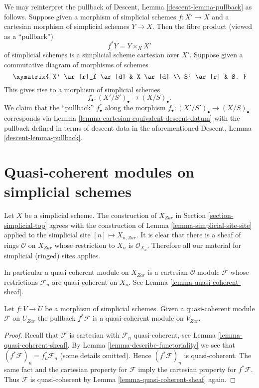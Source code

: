 \noindent
We may reinterpret the pullback of
Descent, Lemma \ref{descent-lemma-pullback} as follows.
Suppose given a morphism of simplicial schemes $f : X' \to X$ and a
cartesian morphism of simplicial schemes $Y \to X$. Then
the fibre product (viewed as a ``pullback'')
$$
f^*Y = Y \times_X X'
$$
of simplicial schemes is a simplicial scheme cartesian over $X'$.
Suppose given a commutative diagram of morphisms of schemes
$$
\xymatrix{
X' \ar[r]_f \ar[d] & X \ar[d] \\
S' \ar[r] & S.
}
$$
This gives rise to a morphism of simplicial schemes
$$
f_\bullet : (X'/S')_\bullet \longrightarrow (X/S)_\bullet.
$$
We claim that the ``pullback'' $f_\bullet^*$ along the morphism
$f_\bullet : (X'/S')_\bullet \to (X/S)_\bullet$ corresponds via
Lemma \ref{lemma-cartesian-equivalent-descent-datum}
with the pullback defined in terms of descent data in
the aforementioned
Descent, Lemma \ref{descent-lemma-pullback}.







\section{Quasi-coherent modules on simplicial schemes}
\label{section-modules-simplicial}

\noindent
Let $X$ be a simplicial scheme. The construction of $X_{Zar}$
in Section \ref{section-simplicial-top} agrees with the
construction of Lemma \ref{lemma-simplicial-site-site}
applied to the simplicial site $[n] \mapsto X_{n, Zar}$.
It is clear that there is a sheaf of rings $\mathcal{O}$
on $X_{Zar}$ whose restriction to $X_n$ is $\mathcal{O}_{X_n}$.
Therefore all our material for simplicial (ringed) sites applies.

\medskip\noindent
In particular a quasi-coherent module on $X_{Zar}$ is
a cartesian $\mathcal{O}$-module $\mathcal{F}$ whose restrictions
$\mathcal{F}_n$ are quasi-coherent on $X_n$. See
Lemma \ref{lemma-quasi-coherent-sheaf}.

\begin{lemma}
\label{lemma-pullback-cartesian-module}
Let $f : V \to U$ be a morphism of simplicial schemes. Given a
quasi-coherent module $\mathcal{F}$ on $U_{Zar}$ the pullback
$f^*\mathcal{F}$ is a quasi-coherent module on $V_{Zar}$.
\end{lemma}

\begin{proof}
Recall that $\mathcal{F}$ is cartesian with $\mathcal{F}_n$
quasi-coherent, see Lemma \ref{lemma-quasi-coherent-sheaf}.
By Lemma \ref{lemma-describe-functoriality} we see that
$(f^*\mathcal{F})_n = f_n^*\mathcal{F}_n$ (some details omitted).
Hence $(f^*\mathcal{F})_n$ is quasi-coherent.
The same fact and the cartesian property for $\mathcal{F}$
imply the cartesian property for $f^*\mathcal{F}$.
Thus $\mathcal{F}$ is quasi-coherent by
Lemma \ref{lemma-quasi-coherent-sheaf} again.
\end{proof}

